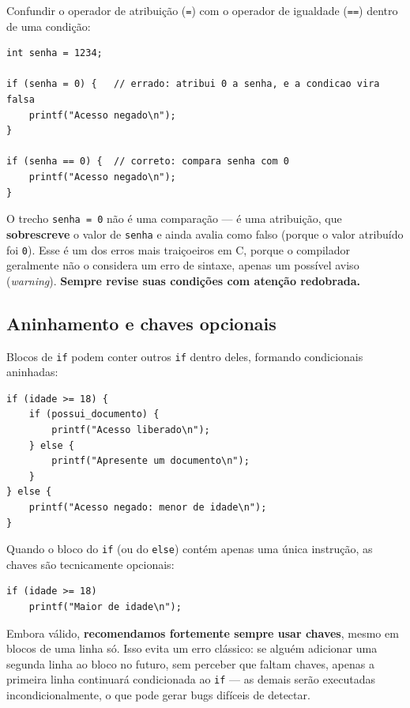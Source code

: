 \documentclass[12pt,a4paper,oneside]{extreport}
\begin{document}
\begin{errocomum}
Confundir o operador de atribuição (\texttt{=}) com o operador de igualdade (\texttt{==}) dentro de uma condição:
\begin{lstlisting}
int senha = 1234;

if (senha = 0) {   // errado: atribui 0 a senha, e a condicao vira falsa
    printf("Acesso negado\n");
}

if (senha == 0) {  // correto: compara senha com 0
    printf("Acesso negado\n");
}
\end{lstlisting}
O trecho \texttt{senha = 0} não é uma comparação — é uma atribuição, que \textbf{sobrescreve} o valor de \texttt{senha} e ainda avalia como falso (porque o valor atribuído foi \texttt{0}). Esse é um dos erros mais traiçoeiros em C, porque o compilador geralmente não o considera um erro de sintaxe, apenas um possível aviso (\textit{warning}). \textbf{Sempre revise suas condições com atenção redobrada.}
\end{errocomum}

\subsection{Aninhamento e chaves opcionais}

Blocos de \texttt{if} podem conter outros \texttt{if} dentro deles, formando condicionais aninhadas:

\begin{lstlisting}
if (idade >= 18) {
    if (possui_documento) {
        printf("Acesso liberado\n");
    } else {
        printf("Apresente um documento\n");
    }
} else {
    printf("Acesso negado: menor de idade\n");
}
\end{lstlisting}

Quando o bloco do \texttt{if} (ou do \texttt{else}) contém apenas uma única instrução, as chaves são tecnicamente opcionais:

\begin{lstlisting}
if (idade >= 18)
    printf("Maior de idade\n");
\end{lstlisting}

Embora válido, \textbf{recomendamos fortemente sempre usar chaves}, mesmo em blocos de uma linha só. Isso evita um erro clássico: se alguém adicionar uma segunda linha ao bloco no futuro, sem perceber que faltam chaves, apenas a primeira linha continuará condicionada ao \texttt{if} — as demais serão executadas incondicionalmente, o que pode gerar bugs difíceis de detectar.
\end{document}
